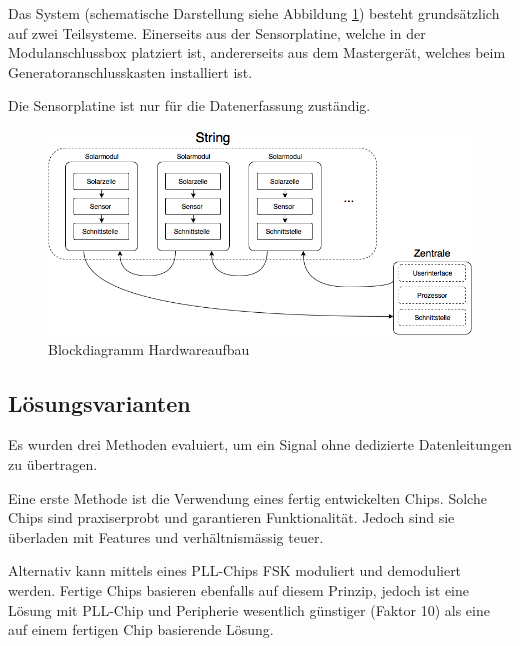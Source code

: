 Das      System      (schematische       Darstellung      siehe      Abbildung
\ref{fig:blockdiag:hardware})     besteht     grunds\"atzlich     auf     zwei
Teilsysteme. Einerseits aus der Sensorplatine, welche in der Modulanschlussbox
platziert   ist,   andererseits   aus    dem   Masterger\"at,   welches   beim
Generatoranschlusskasten installiert ist.

Die Sensorplatine ist nur f\"ur die Datenerfassung zust\"andig.

\begin{figure}[h!]
    \centering
    \includegraphics[width=.9\textwidth]{images/blockdiag.png}
    \caption{Blockdiagramm Hardwareaufbau}
    \label{fig:blockdiag:hardware}
\end{figure}


\subsection{L\"osungsvarianten}
\label{subsec:losungsvarianten}

Es   wurden  drei   Methoden  evaluiert,   um  ein   Signal  ohne   dedizierte
Datenleitungen zu \"ubertragen.

Eine erste Methode ist die Verwendung eines fertig entwickelten Chips.  Solche
Chips sind  praxiserprobt und  garantieren Funktionalit\"at.  Jedoch  sind sie
\"uberladen mit Features und verh\"altnism\"assig teuer.

Alternativ  kann  mittels  eines   PLL-Chips  FSK  moduliert  und  demoduliert
werden. Fertige Chips basieren  ebenfalls auf diesem Prinzip,  jedoch ist eine
L\"osung mit  PLL-Chip und Peripherie  wesentlich g\"unstiger (Faktor  10) als
eine auf einem fertigen Chip basierende L\"osung.

